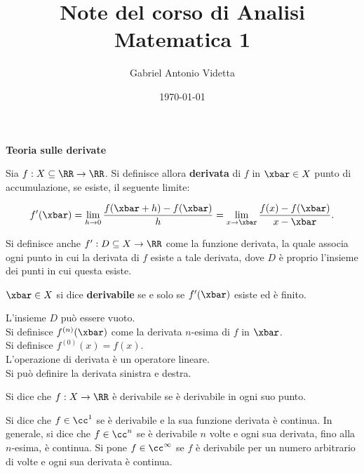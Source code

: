 \documentclass[11pt]{article}
\title{\textbf{Note del corso di Analisi Matematica 1}}
\author{Gabriel Antonio Videtta}
\date{\today}
\begin{document}
	
	\maketitle
	
	\begin{center}
		\Large \textbf{Teoria sulle derivate}
	\end{center}

	\begin{definition}
		Sia $f : X \subseteq \RR \to \RR$. Si definisce allora \textbf{derivata}
		di $f$ in $\xbar \in X$ punto di accumulazione, se esiste, il seguente limite:
		
		\[f'(\xbar) = \lim_{h \to 0} \frac{f(\xbar + h) - f(\xbar)}{h} = \lim_{x \to \xbar} \frac{f(x) - f(\xbar)}{x - \xbar}.\]
		
		Si definisce anche $f' : D \subseteq X \to \RR$ come la funzione derivata,
		la quale associa ogni punto in cui la derivata di $f$ esiste a
		tale derivata, dove $D$ è proprio l'insieme dei punti in cui questa esiste.
	\end{definition}

	
	\begin{definition}
		$\xbar \in X$ si dice \textbf{derivabile} se e solo se $f'(\xbar)$ esiste ed è finito.
	\end{definition}
	
	\begin{remark}\nl
		\li L'insieme $D$ può essere vuoto. \\
		\li Si definisce $f^{(n)}(\xbar)$ come la derivata $n$-esima
		di $f$ in $\xbar$. \\
		\li Si definisce $f^{(0)}(x) = f(x)$. \\
		\li L'operazione di derivata è un operatore lineare. \\
		\li Si può definire la derivata sinistra e destra.
	\end{remark}

	\begin{definition}
		Si dice che $f : X \to \RR$ è derivabile se è derivabile in ogni
		suo punto.
	\end{definition}
	
	\begin{definition}
		Si dice che $f \in \cc^1$ se è derivabile e la sua
		funzione derivata è continua. In generale, si dice che $f \in \cc^n$ se
		è derivabile $n$ volte e ogni sua derivata, fino alla $n$-esima,
		è continua. Si pone $f \in \cc^\infty$ se $f$ è derivabile per un
		numero arbitrario di volte e ogni sua derivata è continua.
	\end{definition}
\end{document}
